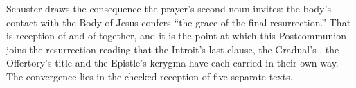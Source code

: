 \begin{witnessnote}
Schuster draws the consequence the prayer's second noun invites: the body's
contact with the Body of Jesus confers ``the grace of the final
resurrection.'' That is reception of  and of  together, and it is the point at which this Postcommunion joins the
resurrection reading that the Introit's last clause, the Gradual's
, the Offertory's title and the Epistle's kerygma have each
carried in their own way. The convergence lies in the checked reception
of five separate texts.
\end{witnessnote}

